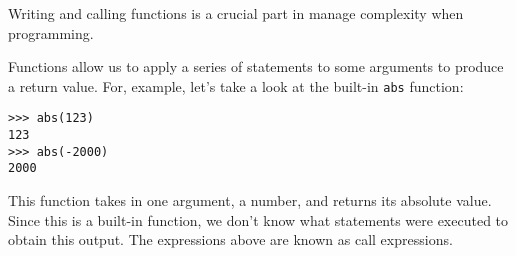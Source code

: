 Writing and calling functions is a crucial part in manage complexity when
programming.

Functions allow us to apply a series of statements to some arguments to produce
a return value. For, example, let's take a look at the built-in \texttt{abs}
function:

\begin{lstlisting}
>>> abs(123)
123
>>> abs(-2000)
2000
\end{lstlisting}

This function takes in one argument, a number, and returns its absolute value.
Since this is a built-in function, we don't know what statements were executed
to obtain this output. The expressions above are known as call expressions.
